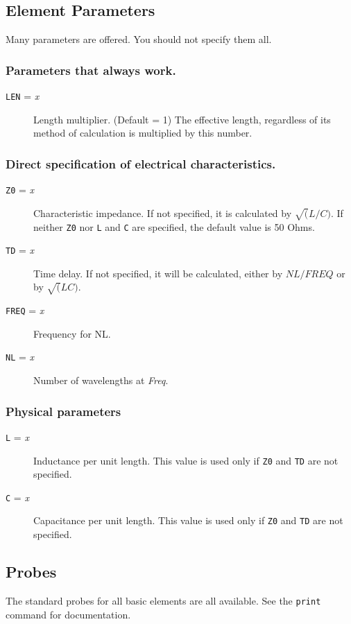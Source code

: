 \subsection{Element Parameters}

Many parameters are offered.  You should not specify them all.

\subsubsection{Parameters that always work.}

\begin{description}

\item[{\tt LEN} = {\it x}]
Length multiplier.  (Default = 1) The effective length, regardless of
its method of calculation is multiplied by this number.

\end{description}


\subsubsection{Direct specification of electrical characteristics.}

\begin{description}

\item[{\tt Z0} = {\it x}]
Characteristic impedance.  If not specified, it is calculated by
$\sqrt(L/C)$.  If neither {\tt Z0} nor {\tt L} and {\tt C} are
specified, the default value is 50 Ohms.

\item[{\tt TD} = {\it x}] Time delay.  If not specified, it will be calculated, either by $NL/FREQ$ or by $\sqrt(L C)$.

\item[{\tt FREQ} = {\it x}] Frequency for NL.

\item[{\tt NL} = {\it x}] Number of wavelengths at {\it Freq}.

\end{description}

\subsubsection{Physical parameters}

\begin{description}

\item[{\tt L} = {\it x}]
Inductance per unit length.  This value is used only if {\tt Z0} and
{\tt TD} are not specified.

\item[{\tt C} = {\it x}]
Capacitance per unit length.  This value is used only if {\tt Z0} and
{\tt TD} are not specified.

\end{description}
\subsection{Probes}

The standard probes for all basic elements are all available.  See the
{\tt print} command for documentation.
